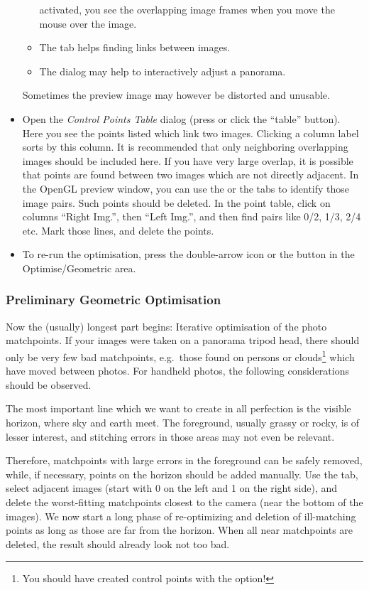 \begin{itemize}
\begin{itemize}
    activated, you see the overlapping image frames when you move the
    mouse over the image.
  \item The  tab helps finding links between images.
  \item The  dialog may help to interactively adjust a
    panorama.
  \end{itemize}
  Sometimes the preview image may however be distorted and unusable.
\item Open the \emph{Control Points Table} dialog (press  or click the ``table''
  button). Here you see the points listed which link two
  images. Clicking a column label sorts by this column. It is
  recommended that only neighboring overlapping images should be
  included here. If you have very large overlap, it is possible that
  points are found between two images which are not directly
  adjacent. In the OpenGL preview window, you can use the  or
  the  tabs to identify those image pairs. Such points should be
  deleted. In the point table, click on columns ``Right Img.'', then
  ``Left Img.'', and then find pairs like 0/2, 1/3, 2/4 etc. Mark
  those lines, and delete the points.
\item To re-run the optimisation, press the double-arrow icon or the
   button in the Optimise/Geometric area.
\end{itemize}


\subsubsection{Preliminary Geometric Optimisation}
\label{sec:landscapes:Optimisation}


Now the (usually) longest part begins: Iterative optimisation of the
photo matchpoints. If your images were taken on a panorama tripod
head, there should only be very few bad matchpoints, e.g.\ those found
on persons or clouds\footnote{You should have created control points
  with the  option!} which have moved between
photos. For handheld photos, the following considerations should be
observed.

The most important line which we want to create in all perfection is the visible
horizon, where sky and earth meet. The foreground, usually grassy or
rocky, is of lesser interest, and stitching errors in those areas may
not even be relevant.

Therefore, matchpoints with large errors in the foreground can be
safely removed, while, if necessary, points on the horizon should be
added manually. Use the  tab, select adjacent
images (start with 0 on the left and 1 on the right side), and delete
the worst-fitting matchpoints closest to the camera (near the bottom
of the images). We now start a long phase of re-optimizing and
deletion of ill-matching points as long as those are far from the
horizon. When all near matchpoints are deleted, the result should
already look not too bad.

